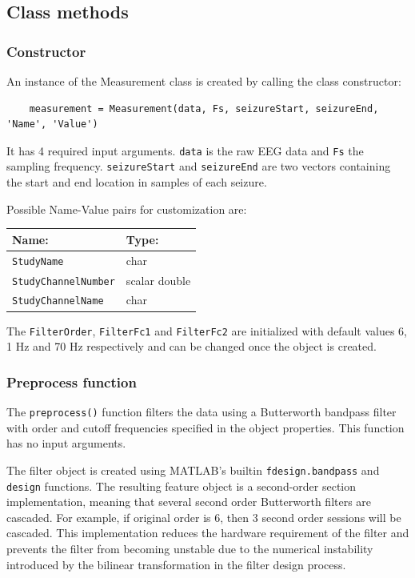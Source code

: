 \documentclass[usletter, 11pt]{extarticle}
\begin{document}
\subsection{Class methods}

\subsubsection{Constructor}

An instance of the Measurement class is created by calling the class constructor:
\begin{Verbatim}
	measurement = Measurement(data, Fs, seizureStart, seizureEnd, 'Name', 'Value')
\end{Verbatim}

It has 4 required input arguments. \verb|data| is the raw EEG data and \verb|Fs| the sampling frequency. \verb|seizureStart| and \verb|seizureEnd| are two vectors containing the start and end location in samples of each seizure.

Possible Name-Value pairs for customization are:
\begin{center}
	\begin{tabular}{p{4cm}|p{4cm}}
	\textbf{Name:} & \textbf{Type:} \\ \hline
	\texttt{StudyName} & char\\
	\texttt{StudyChannelNumber} & scalar double \\
	\texttt{StudyChannelName} & char \\
\end{tabular}
\end{center}

The \texttt{FilterOrder}, \verb|FilterFc1| and \texttt{FilterFc2} are initialized with default values 6, 1 Hz and 70 Hz respectively and can be changed once the object is created.

\subsubsection{Preprocess function}

The \verb|preprocess()| function filters the data using a Butterworth bandpass filter with order and cutoff frequencies specified in the object properties.  This function has no input arguments.

The filter object is created using MATLAB's builtin \verb|fdesign.bandpass| and \verb|design| functions. The resulting feature object is a second-order section implementation, meaning that several second order Butterworth filters are cascaded. For example, if original order is 6, then 3 second order sessions will be cascaded. This implementation reduces the hardware requirement of the filter and prevents the filter from becoming unstable due to the numerical instability introduced by the bilinear transformation in the filter design process.
\end{document}
